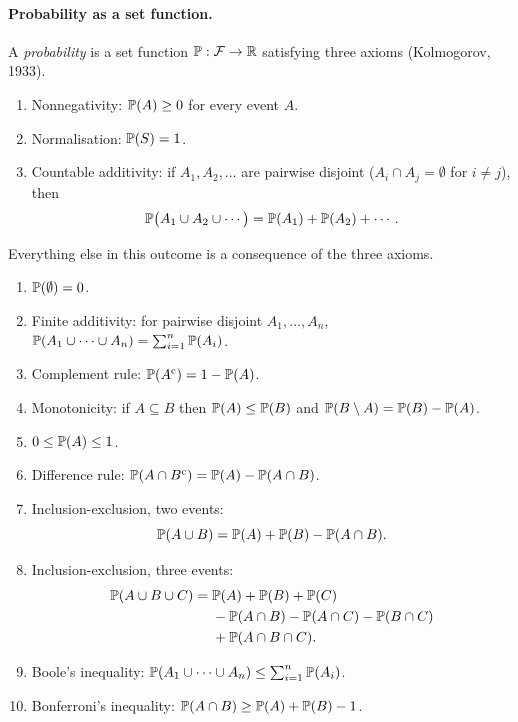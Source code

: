 \paragraph{Probability as a set function.}
A \emph{probability} is a set function $\mathbb{P} : \mathcal{F} \to \mathbb{R}$
satisfying three axioms (Kolmogorov, 1933).

\begin{keyfact}
\begin{enumerate}[nosep,label=\textbf{A\arabic*.}]
  \item Nonnegativity: $\mathbb{P}(A) \ge 0$ for every event $A$.
  \item Normalisation: $\mathbb{P}(S) = 1$.
  \item Countable additivity: if $A_1, A_2, \ldots$ are pairwise disjoint
        ($A_i \cap A_j = \emptyset$ for $i \ne j$), then
        \[
          \mathbb{P}\bigl(A_1 \cup A_2 \cup \cdots\bigr) = \mathbb{P}(A_1) + \mathbb{P}(A_2) + \cdots .
        \]
\end{enumerate}
\end{keyfact}

Everything else in this outcome is a consequence of the three axioms.

\begin{keyfact}
\begin{enumerate}[nosep,label=\textbf{C\arabic*.}]
  \item $\mathbb{P}(\emptyset) = 0$.
  \item Finite additivity: for pairwise disjoint $A_1, \ldots, A_n$,
        $\mathbb{P}(A_1 \cup \cdots \cup A_n) = \sum_{i=1}^{n} \mathbb{P}(A_i)$.
  \item Complement rule: $\mathbb{P}(A^{\mathrm{c}}) = 1 - \mathbb{P}(A)$.
  \item Monotonicity: if $A \subseteq B$ then $\mathbb{P}(A) \le \mathbb{P}(B)$ and
        $\mathbb{P}(B \setminus A) = \mathbb{P}(B) - \mathbb{P}(A)$.
  \item $0 \le \mathbb{P}(A) \le 1$.
  \item Difference rule: $\mathbb{P}(A \cap B^{\mathrm{c}}) = \mathbb{P}(A) - \mathbb{P}(A \cap B)$.
  \item Inclusion-exclusion, two events:
        \[
          \mathbb{P}(A \cup B) = \mathbb{P}(A) + \mathbb{P}(B) - \mathbb{P}(A \cap B).
        \]
  \item Inclusion-exclusion, three events:
        \begin{align*}
          \mathbb{P}(A \cup B \cup C) = {}& \mathbb{P}(A) + \mathbb{P}(B) + \mathbb{P}(C) \\
          & - \mathbb{P}(A\cap B) - \mathbb{P}(A \cap C) - \mathbb{P}(B \cap C) \\
          & + \mathbb{P}(A \cap B \cap C).
        \end{align*}
  \item Boole's inequality: $\mathbb{P}(A_1 \cup \cdots \cup A_n) \le \sum_{i=1}^{n}\mathbb{P}(A_i)$.
  \item Bonferroni's inequality: $\mathbb{P}(A \cap B) \ge \mathbb{P}(A) + \mathbb{P}(B) - 1$.
\end{enumerate}
\end{keyfact}

